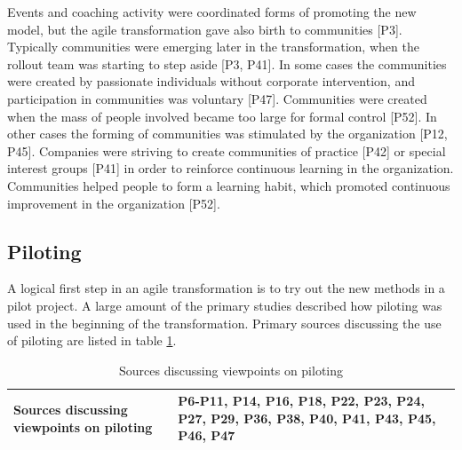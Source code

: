 
Events and coaching activity were coordinated forms of promoting the new model,
but the agile transformation gave also birth to communities [P3]. Typically
communities were emerging later in the transformation, when the rollout team
was starting to step aside [P3, P41].
In some cases the communities were created by passionate individuals without
corporate intervention, and participation in communities was voluntary [P47].
Communities were created when the mass of people involved became too large for
formal control [P52].
In other cases the forming of communities was stimulated by the organization
[P12, P45].
Companies were striving to create communities of practice [P42] or special interest
groups [P41] in order to reinforce continuous learning in the organization.
Communities helped people to form a learning habit, which promoted continuous
improvement in the organization [P52].


\subsection{Piloting}


A logical first step in an agile transformation is to try out the new methods in
a pilot project. A large amount of the primary studies described how piloting
was used in the beginning of the transformation. Primary sources discussing
the use of piloting are listed in table \ref{table:transformation_piloting}. 

\begin{table}[h]
    \centering
    \begin{tabular}{ >{\raggedright\arraybackslash}p{}
                     >{\raggedright\arraybackslash}p{} }
        \toprule
        Sources discussing viewpoints on piloting   & 
                P6-P11, P14, P16, P18, P22, P23, P24, P27, P29,
                P36, P38, P40, P41, P43, P45, P46, P47  \\
        \bottomrule
    \end{tabular}
    \caption{Sources discussing viewpoints on piloting}
    \label{table:transformation_piloting}
\end{table}


